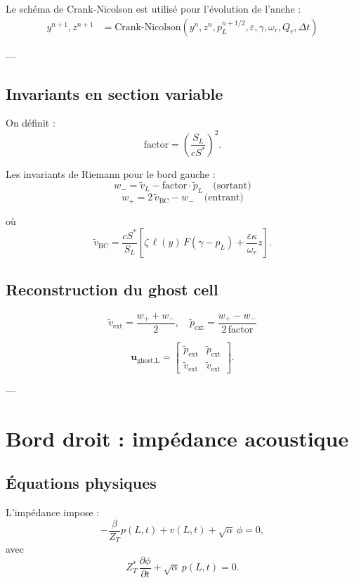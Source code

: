 \documentclass[12pt,a4paper]{article}
\begin{document}
Le schéma de Crank-Nicolson est utilisé pour l'évolution de l'anche :
\begin{align}
y^{n+1}, z^{n+1} &= \text{Crank-Nicolson}(y^n, z^n, p_L^{n+1/2}, \varepsilon, \gamma, \omega_r, Q_r, \Delta t)
\end{align}

---

\subsection{Invariants en section variable}

On définit :
\[
\text{factor} = \left(\frac{S_L}{c S^*}\right)^2.
\]

Les invariants de Riemann pour le bord gauche :
\[
w_- = \tilde{v}_L - \text{factor} \cdot \tilde{p}_L \quad \text{(sortant)}
\]
\[
w_+ = 2 \, \tilde{v}_{\text{BC}} - w_- \quad \text{(entrant)}
\]

où
\[
\tilde{v}_{\text{BC}} = \frac{c S^*}{S_L} \left[ \zeta \, \ell(y) \, F(\gamma - p_L) + \frac{\varepsilon \kappa}{\omega_r} z \right].
\]

\subsection{Reconstruction du ghost cell}

\[
\tilde{v}_{\text{ext}} = \frac{w_+ + w_-}{2}, \quad
\tilde{p}_{\text{ext}} = \frac{w_+ - w_-}{2 \, \text{factor}}
\]

\[
\mathbf{u}_{\text{ghost,L}} =
\begin{bmatrix}
\tilde{p}_{\text{ext}} & \tilde{p}_{\text{ext}} \\
\tilde{v}_{\text{ext}} & \tilde{v}_{\text{ext}}
\end{bmatrix}.
\]

---

\section{Bord droit : impédance acoustique}

\subsection{Équations physiques}

L'impédance impose :
\begin{equation}
- \frac{\beta}{Z_T} p(L,t) + v(L,t) + \sqrt{\alpha} \, \phi = 0,
\end{equation}
avec
\begin{equation}
Z_T^* \, \frac{\partial \phi}{\partial t} + \sqrt{\alpha} \, p(L,t) = 0.
\end{equation}
\end{document}
